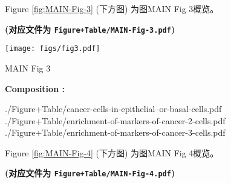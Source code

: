 \documentclass[
]{article}
\begin{document}
\begin{center}\vspace{1.5cm}\end{center}

\begin{center}\vspace{1.5cm}\end{center}

Figure \ref{fig:MAIN-Fig-3} (下方图) 为图MAIN Fig 3概览。

\textbf{(对应文件为 \texttt{Figure+Table/MAIN-Fig-3.pdf})}

\def\@captype{figure}
\begin{center}
\texttt{[image: figs/fig3.pdf]}
\caption{MAIN Fig 3}\label{fig:MAIN-Fig-3}
\end{center}
\begin{center}\begin{tcolorbox}[colback=gray!10, colframe=gray!50, width=0.9\linewidth, arc=1mm, boxrule=0.5pt]
\textbf{
Composition
:}

\vspace{0.5em}

    ./Figure+Table/cancer-cells-in-epithelial--or-basal-cells.pdf
\newline
./Figure+Table/enrichment-of-markers-of-cancer-2-cells.pdf
\newline
./Figure+Table/enrichment-of-markers-of-cancer-3-cells.pdf

\vspace{2em}
\end{tcolorbox}
\end{center}

\begin{center}\vspace{1.5cm}\end{center}

\begin{center}\vspace{1.5cm}\end{center}

Figure \ref{fig:MAIN-Fig-4} (下方图) 为图MAIN Fig 4概览。

\textbf{(对应文件为 \texttt{Figure+Table/MAIN-Fig-4.pdf})}
\end{document}
